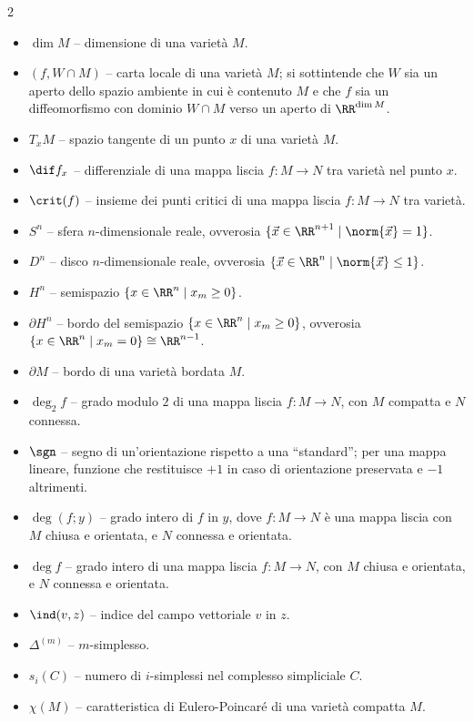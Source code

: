 \begin{multicols*}{2}
      \begin{itemize}
            \item $\dim M$ -- dimensione di una varietà $M$.
            \item $(f, W \cap M)$ -- carta locale di una varietà $M$; si sottintende che $W$ sia un aperto dello spazio ambiente in cui è contenuto $M$ e
                  che $f$ sia un diffeomorfismo con dominio $W \cap M$ verso un aperto di $\RR^{\dim M}$.
            \item $T_x M$ -- spazio tangente di un punto $x$ di una varietà $M$.
            \item $\dif f_x$ -- differenziale di una mappa liscia $f : M \to N$ tra varietà nel punto $x$.
            \item $\crit(f)$ -- insieme dei punti critici di una mappa liscia $f : M \to N$ tra varietà.
            \item $S^n$ -- sfera $n$-dimensionale reale, ovverosia $\{\vec{x} \in \RR^{n+1} \mid \norm{\vec{x}} = 1\}$.
            \item $D^n$ -- disco $n$-dimensionale reale, ovverosia $\{\vec{x} \in \RR^{n} \mid \norm{\vec{x}} \leq 1\}$.
            \item $H^n$ -- semispazio $\{ x \in \RR^n \mid x_m \geq 0 \}$.
            \item $\partial H^n$ -- bordo del semispazio $\{ x \in \RR^n \mid x_m \geq 0 \}$, ovverosia $\{ x \in \RR^n \mid x_m = 0 \} \cong \RR^{n-1}$.
            \item $\partial M$ -- bordo di una varietà bordata $M$.
            \item $\deg_2 f$ -- grado modulo $2$ di una mappa liscia $f : M \to N$, con $M$ compatta e $N$ connessa.
            \item $\sgn$ -- segno di un'orientazione rispetto a una ``standard''; per una mappa lineare, funzione che restituisce
                  $+1$ in caso di orientazione preservata e $-1$ altrimenti.
            \item $\deg(f; y)$ -- grado intero di $f$ in $y$, dove $f : M \to N$ è una mappa liscia con $M$ chiusa e orientata, e $N$ connessa e orientata.
            \item $\deg f$ -- grado intero di una mappa liscia $f : M \to N$, con $M$ chiusa e orientata, e $N$ connessa e orientata.
            \item $\ind(v, z)$ -- indice del campo vettoriale $v$ in $z$.
            \item $\Delta^{(m)}$ -- $m$-simplesso.
            \item $s_i(C)$ -- numero di $i$-simplessi nel complesso simpliciale $C$.
            \item $\chi(M)$ -- caratteristica di Eulero-Poincaré di una varietà compatta $M$.
      \end{itemize}


\end{multicols*}
